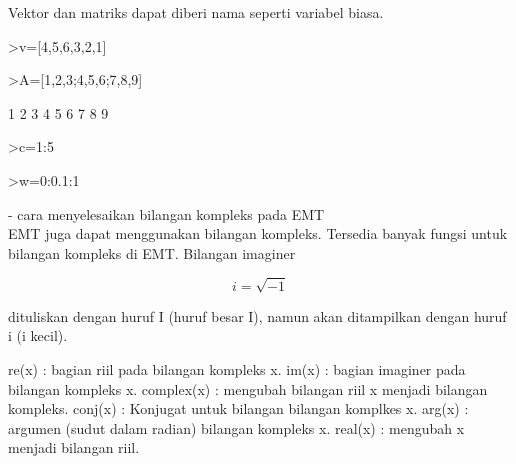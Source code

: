 \documentclass[a4paper,10pt]{article}
\begin{document}
\begin{eulernotebook}
\begin{eulercomment}
\begin{eulercomment}
\begin{eulercomment}
Vektor dan matriks dapat diberi nama seperti variabel biasa.
\end{eulercomment}
\begin{eulerprompt}
>v=[4,5,6,3,2,1]
\end{eulerprompt}
\begin{euleroutput}
  [4,  5,  6,  3,  2,  1]
\end{euleroutput}
\begin{eulerprompt}
>A=[1,2,3;4,5,6;7,8,9]
\end{eulerprompt}
\begin{euleroutput}
              1             2             3 
              4             5             6 
              7             8             9 
\end{euleroutput}
\begin{eulerprompt}
>c=1:5
\end{eulerprompt}
\begin{euleroutput}
  [1,  2,  3,  4,  5]
\end{euleroutput}
\begin{eulerprompt}
>w=0:0.1:1
\end{eulerprompt}
\begin{euleroutput}
  [0,  0.1,  0.2,  0.3,  0.4,  0.5,  0.6,  0.7,  0.8,  0.9,  1]
\end{euleroutput}
\begin{eulercomment}
- cara menyelesaikan bilangan kompleks pada EMT\\
EMT juga dapat menggunakan bilangan kompleks. Tersedia banyak fungsi untuk bilangan kompleks
di EMT. Bilangan imaginer

\end{eulercomment}
\begin{eulerformula}
\[
i = \sqrt{-1}
\]
\end{eulerformula}
\begin{eulercomment}
dituliskan dengan huruf I (huruf besar I), namun akan ditampilkan dengan huruf i (i kecil).

\end{eulercomment}
\begin{eulerttcomment}
  re(x) : bagian riil pada bilangan kompleks x.
  im(x) : bagian imaginer pada bilangan kompleks x.
  complex(x) : mengubah bilangan riil x menjadi bilangan kompleks.
  conj(x) : Konjugat untuk bilangan bilangan komplkes x.
  arg(x) : argumen (sudut dalam radian) bilangan kompleks x.
  real(x) : mengubah x menjadi bilangan riil.
\end{eulerttcomment}
\begin{eulercomment}


\end{eulercomment}
\end{eulercomment}
\end{eulercomment}
\end{eulernotebook}
\end{document}
